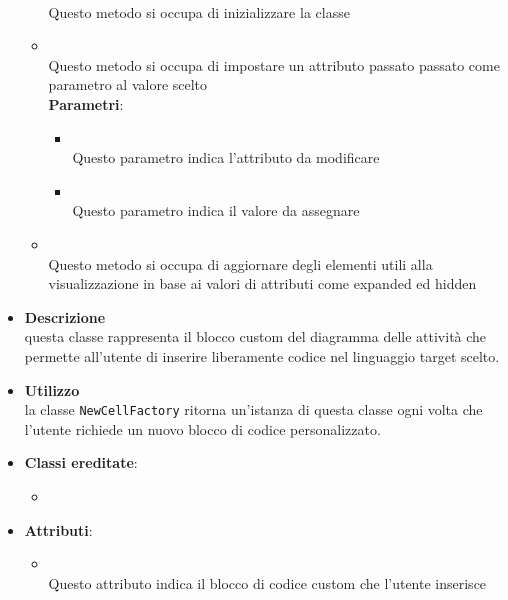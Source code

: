 \begin{itemize}
\begin{itemize}
\\ Questo metodo si occupa di inizializzare la classe
\item {}
\\ Questo metodo si occupa di impostare un attributo passato passato come parametro al valore scelto
\\ \textbf{Parametri}:
\begin{itemize}
\item {}
\\ Questo parametro indica l'attributo da modificare
\item {}
\\ Questo parametro indica il valore da assegnare
\end{itemize}
\item {}
\\ Questo metodo si occupa di aggiornare degli elementi utili alla visualizzazione in base ai valori di attributi come expanded ed hidden
\end{itemize}
\end{itemize}

\label{\nogloxy{swedesigner::client::model::celltypes::activity::HxCustom}}
\begin{itemize}
\item \textbf{Descrizione}\\
questa classe rappresenta il blocco custom del diagramma delle attività che permette all'utente di inserire liberamente codice nel linguaggio target scelto.
\item \textbf{Utilizzo}\\
la classe \texttt{NewCellFactory} ritorna un'istanza di questa classe ogni volta che l'utente richiede un nuovo blocco di codice personalizzato.
\item \textbf{Classi ereditate}:
\begin{itemize}
\item \hyperref[\nogloxy{swedesigner::client::model::celltypes::activity::ActivityDiagramElement}]{}
\end{itemize}
\item \textbf{Attributi}:
\begin{itemize}
\item {}
\\ Questo attributo indica il blocco di codice custom che l'utente inserisce
\end{itemize}
\end{itemize}

